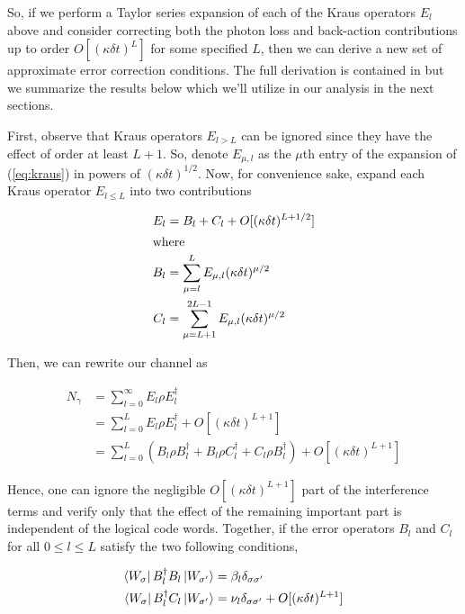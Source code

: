 \documentclass[12]{amsart}
\newcommand\0{\mathbf{0}}
\newcommand\<{\langle}
\renewcommand\>{\rangle}
\begin{document}
So, if we perform a Taylor series expansion of each of the Kraus operators $E_l$ above and consider correcting both the photon loss and back-action contributions up to order $O[(\kappa \delta t)^L]$ for some specified $L$, then we can derive a new set of approximate error correction conditions. The full derivation is contained in \cite{michael2016new} but we summarize the results below which we'll utilize in our analysis in the next sections.

First, observe that Kraus operators $E_{l>L}$ can be ignored since they have the effect of order at least $L+1$. So, denote $E_{\mu, l}$ as the $\mu$th entry of the expansion of (\ref{eq:kraus}) in powers of $(\kappa\delta t)^{1/2}$. Now, for convenience sake, expand each Kraus operator $E_{l \leq L}$ into two contributions

\begin{align*}
E_l &= B_l + C_l + O[(\kappa \delta t)^{L + 1/2}]	\\
\intertext{where}
B_l &= \sum_{\mu = l }^L E_{\mu, l}(\kappa \delta t)^{\mu / 2} \\
C_l &= \sum_{\mu = L+1 }^{2L - 1} E_{\mu, l}(\kappa \delta t)^{\mu / 2} \\
\end{align*}

Then, we can rewrite our channel as 

\begin{align*}
N_\gamma &= \sum_{l=0}^\infty E_l \rho E_l^\dag\\
&= \sum_{l=0}^L E_l \rho E_l^\dag + O[(\kappa \delta t)^{L + 1}] \\
&= \sum_{l=0}^L(B_l \rho B_l^\dag + B_l \rho C_l^\dag + C_l \rho B_l^\dag) + O[(\kappa \delta t)^{L + 1}]
\end{align*}

Hence, one can ignore the negligible $O[(\kappa \delta t)^{L + 1}]$ part of the interference terms and verify only that the effect of the remaining important part is independent of the logical code words. Together, if the error operators $B_l$ and $C_l$ for all $0 \leq l \leq L$ satisfy the two following conditions,

\begin{align}
\label{eq:aqec}
\begin{split}
\bra{W_\sigma} B_l^\dag B_l \ket{W_{\sigma'}} &= \beta_l \delta_{\sigma \sigma'} \\
\bra{W_\sigma} B_l^\dag C_l \ket{W_{ \sigma'}} &= \nu_l \delta_{\sigma \sigma'}	+ O[(\kappa \delta t)^{L + 1}]
\end{split}
\end{align}
\end{document}
